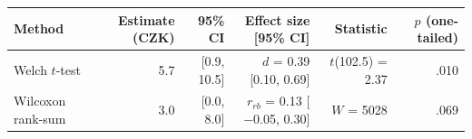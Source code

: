 \begin{tabular}{lrrrrr}
  \toprule
Method & Estimate (CZK) & 95\% CI & Effect size [95\% CI] & Statistic & $p$ (one-tailed) \\ 
  \midrule
Welch $t$-test & 5.7 & [0.9, 10.5] & $d$ = 0.39 [0.10, 0.69] & $t$(102.5) = 2.37 & .010 \\ 
  Wilcoxon rank-sum & 3.0 & [0.0, 8.0] & $r_{rb}$ = 0.13 [$-$0.05, 0.30] & $W$ = 5028 & .069 \\ 
   \bottomrule
\end{tabular}
